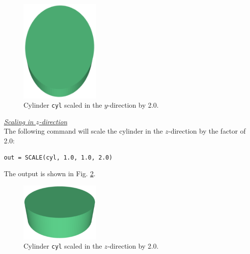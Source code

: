 \begin{figure}[!ht]
\begin{center}
\includegraphics[width=0.35\textwidth]{img/scale-2.png}
\end{center}
\vspace{-4mm}
\caption{Cylinder {\tt cyl} scaled in the $y$-direction by 2.0.}
\label{fig:scale-2}
\end{figure}

\newpage
\noindent
\underline{\em Scaling in $z$-direction}\\

The following command will 
scale the cylinder in the $z$-direction by the factor of 2.0: \\

\begin{bbox}
\begin{verbatim}
out = SCALE(cyl, 1.0, 1.0, 2.0)
\end{verbatim}
\end{bbox}
\vspace{6mm}

\noindent
The output is shown in Fig. \ref{fig:scale-3}.

\begin{figure}[!ht]
\begin{center}
\includegraphics[width=0.35\textwidth]{img/scale-3.png}
\end{center}
\vspace{-4mm}
\caption{Cylinder {\tt cyl} scaled in the $z$-direction by 2.0.}
\label{fig:scale-3}
\end{figure}


